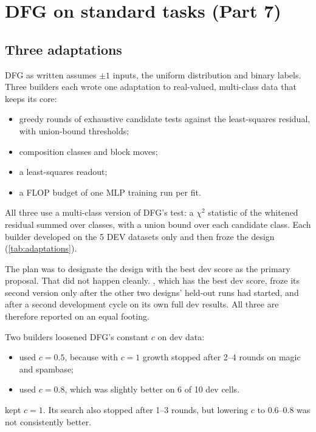 \section{DFG on standard tasks (Part 7)}\label{sec:standard}

\subsection{Three adaptations}\label{sec:adaptations}

DFG as written assumes $\pm1$ inputs, the uniform distribution and binary labels. Three builders each wrote one adaptation to real-valued, multi-class data that keeps its core:
\begin{itemize}
\item greedy rounds of exhaustive candidate tests against the least-squares residual, with union-bound thresholds;
\item composition classes and block moves;
\item a least-squares readout;
\item a FLOP budget of one MLP training run per fit.
\end{itemize}
All three use a multi-class version of DFG's test: a $\chi^2$ statistic of the whitened residual summed over classes, with a union bound over each candidate class. Each builder developed on the 5 DEV datasets only and then froze the design (\cref{tab:adaptations}).

The plan was to designate the design with the best dev score as the primary proposal. That did not happen cleanly. , which has the best dev score, froze its second version only after the other two designs' held-out runs had started, and after a second development cycle on its own full dev results. All three are therefore reported on an equal footing.

Two builders loosened DFG's constant $c$ on dev data:
\begin{itemize}
\item {} used $c=0.5$, because with $c=1$ growth stopped after 2--4 rounds on magic and spambase;
\item {} used $c=0.8$, which was slightly better on 6 of 10 dev cells.
\end{itemize}
 kept $c=1$. Its search also stopped after 1--3 rounds, but lowering $c$ to 0.6--0.8 was not consistently better.

